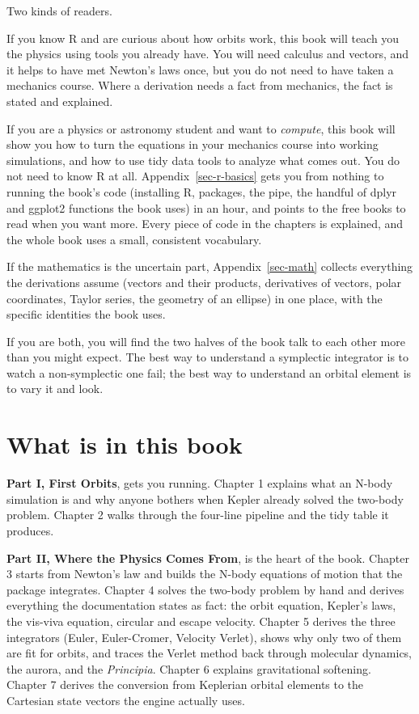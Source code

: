 \documentclass[
  10.5pt,
  letterpaper,
]{scrbook}
\theoremstyle{plain}
\theoremstyle{remark}
\begin{document}

Two kinds of readers.

If you know R and are curious about how orbits work, this book will
teach you the physics using tools you already have. You will need
calculus and vectors, and it helps to have met Newton's laws once, but
you do not need to have taken a mechanics course. Where a derivation
needs a fact from mechanics, the fact is stated and explained.

If you are a physics or astronomy student and want to \emph{compute},
this book will show you how to turn the equations in your mechanics
course into working simulations, and how to use tidy data tools to
analyze what comes out. You do not need to know R at all.
Appendix~\ref{sec-r-basics} gets you from nothing to running the book's
code (installing R, packages, the pipe, the handful of dplyr and ggplot2
functions the book uses) in an hour, and points to the free books to
read when you want more. Every piece of code in the chapters is
explained, and the whole book uses a small, consistent vocabulary.

If the mathematics is the uncertain part, Appendix~\ref{sec-math}
collects everything the derivations assume (vectors and their products,
derivatives of vectors, polar coordinates, Taylor series, the geometry
of an ellipse) in one place, with the specific identities the book uses.

If you are both, you will find the two halves of the book talk to each
other more than you might expect. The best way to understand a
symplectic integrator is to watch a non-symplectic one fail; the best
way to understand an orbital element is to vary it and look.

\section*{What is in this book}\label{what-is-in-this-book}


\textbf{Part I, First Orbits}, gets you running. Chapter 1 explains what
an N-body simulation is and why anyone bothers when Kepler already
solved the two-body problem. Chapter 2 walks through the four-line
pipeline and the tidy table it produces.

\textbf{Part II, Where the Physics Comes From}, is the heart of the
book. Chapter 3 starts from Newton's law and builds the N-body equations
of motion that the package integrates. Chapter 4 solves the two-body
problem by hand and derives everything the documentation states as fact:
the orbit equation, Kepler's laws, the vis-viva equation, circular and
escape velocity. Chapter 5 derives the three integrators (Euler,
Euler-Cromer, Velocity Verlet), shows why only two of them are fit for
orbits, and traces the Verlet method back through molecular dynamics,
the aurora, and the \emph{Principia}. Chapter 6 explains gravitational
softening. Chapter 7 derives the conversion from Keplerian orbital
elements to the Cartesian state vectors the engine actually uses.
\end{document}
